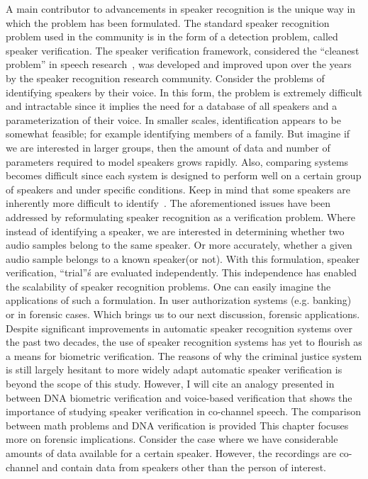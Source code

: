 A main contributor to advancements in speaker recognition is the unique way in which the problem has been formulated. 
The standard speaker recognition problem used in the community is in the form of a detection problem, called speaker verification. 
The speaker verification framework, considered the ``cleanest problem'' in speech research~\cite{anintroductiontoapplicationindependentevaluationofspeakerrecognitionsystems}, was developed and improved upon over the years by the speaker recognition research community. 
Consider the problems of identifying speakers by their voice. 
In this form, the problem is extremely difficult and intractable since it implies the need for a database of all speakers and a parameterization of their voice. 
In smaller scales, identification appears to be somewhat feasible; for example identifying members of a family. 
But imagine if we are interested in larger groups, then the amount of data and number of parameters required to model speakers grows rapidly. 
Also, comparing systems becomes difficult since each system is designed to perform well on a certain group of speakers and under specific conditions. 
Keep in mind that some speakers are inherently more difficult to identify~\cite{farmmodel}.
The aforementioned issues have been addressed by reformulating speaker recognition as a verification problem. 
Where instead of identifying a speaker, we are interested in determining whether two audio samples belong to the same speaker. 
Or more accurately, whether a given audio sample belongs to a known speaker(or not). 
With this formulation, speaker verification, ``trial''\'s are evaluated independently. 
This independence has enabled the scalability of speaker recognition problems. 
One can easily imagine the applications of such a formulation. 
In user authorization systems (e.g. banking) or in forensic cases. 
Which brings us to our next discussion, forensic applications. 
Despite significant improvements in automatic speaker recognition systems over the past two decades, the use of speaker recognition systems has yet to flourish as a means for biometric verification. 
The reasons of why the criminal justice system is still largely hesitant to more widely adapt automatic speaker verification is beyond the scope of this study. 
However, I will cite an analogy presented in~\cite{reva_nist} between DNA biometric verification and voice-based verification that shows the importance of studying speaker verification in co-channel speech. 
The comparison between math problems and DNA verification is provided 
This chapter focuses more on forensic implications. 
Consider the case where we have considerable amounts of data available for a certain speaker. 
However, the recordings are co-channel and contain data from speakers other than the person of interest. 
